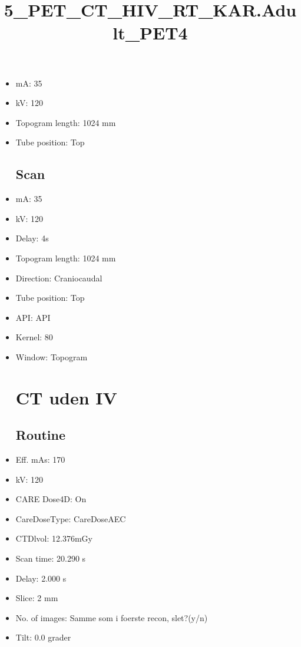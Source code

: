 \documentclass[12pt]{article}
\title{5\_PET\_CT\_HIV\_RT\_KAR.Adult\_PET4}
\begin{document}
\maketitle
\newpage
\tableofcontents
\newpage
{}


\begin{itemize}\section{Topogram}
\subsection{Routine}
\item mA: 35\item kV: 120\item Topogram length: 1024 mm\item Tube position: Top
\subsection{Scan}\item mA: 35\item kV: 120\item Delay: 4s\item Topogram length: 1024 mm\item Direction: Craniocaudal\item Tube position: Top\item API: API \item Kernel: 80\item Window: Topogram
\section{CT uden IV}
\subsection{Routine}
\item Eff. mAs: 170\item kV: 120\item CARE Dose4D: On\item CareDoseType: CareDoseAEC\item CTDlvol: 12.376mGy\item Scan time: 20.290 s\item Delay: 2.000 s\item Slice: 2 mm\item No. of images: Samme som i foerste recon, slet?(y/n)\item Tilt: 0.0 grader

\end{itemize}
\end{document}

